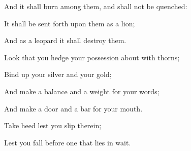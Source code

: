 {\par }{\Q And it shall burn among them, and shall not be quenched:
\par }{\Q It shall be sent forth upon them as a lion;
\par }{\Q And as a leopard it shall destroy them.
\par }{\Q {}Look that you hedge your possession about with thorns;
\par }{\Q Bind up your silver and your gold;
\par }{\Q {}And make a balance and a weight for your words;
\par }{\Q And make a door and a bar for your mouth.
\par }{\Q {}Take heed lest you slip therein;
\par }{\Q Lest you fall before one that lies in wait.
\par }{\BB \par }
